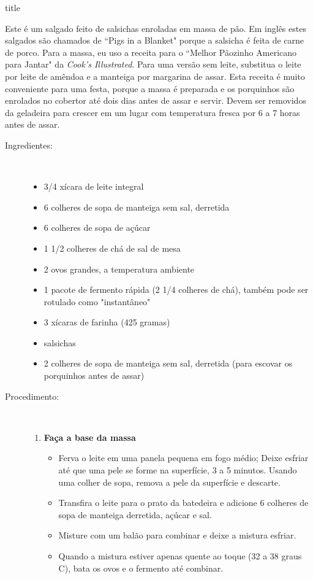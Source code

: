 \documentclass [11pt, papel de carta] {article}
\begin{document}
 {title}


Este \'e um salgado feito de salsichas enroladas em massa de p\~ao. Em ingl\^es estes salgados s\~ao chamados de ``Pigs in a Blanket" porque a salsicha \'e feita de carne de porco. Para a massa, eu uso a receita para o ``Melhor P\~aozinho Americano para Jantar" da {\it Cook's Illustrated}. Para uma versão sem leite, substitua o leite por leite de amêndoa e a manteiga por margarina de assar. Esta receita é muito conveniente para uma festa, porque a massa é preparada e os porquinhos s\~ao enrolados no cobertor até dois dias antes de assar e servir. Devem ser removidos da geladeira para crescer em um lugar com temperatura fresca por 6 a 7 horas antes de assar.

\vspace {0.3in}
\begin {description}

\item [Ingredientes:] \ \\
\begin {itemize}
\item 3/4 xícara de leite integral
\item 6 colheres de sopa de manteiga sem sal, derretida
\item 6 colheres de sopa de açúcar
\item 1 1/2 colheres de chá de sal de mesa
\item 2 ovos grandes, a temperatura ambiente
\item 1 pacote de fermento rápida (2 1/4 colheres de chá), também pode ser rotulado como "instantâneo"
\item 3 xícaras de farinha (425 gramas)
\item salsichas
\item 2 colheres de sopa de manteiga sem sal, derretida (para escovar os porquinhos antes de assar)
\end {itemize}

\item [Procedimento:] \ \\
\begin {enumerate}
\item {\bf Faça a base da massa}
\begin {itemize}
\item Ferva o leite em uma panela pequena em fogo médio; Deixe esfriar até que uma pele se forme na superfície,
3 a 5 minutos. Usando uma colher de sopa, remova a pele da superfície e descarte.
\item Transfira o leite para o prato da batedeira e adicione 6
colheres de sopa de manteiga derretida, açúcar e sal.
\item Misture com um bal\~ao para combinar e deixe a mistura esfriar.
\item Quando a mistura estiver apenas quente ao toque (32 a 38 graus C), bata os ovos e o fermento até combinar.
\end {itemize}



\end{enumerate}
\end{description}
\end{document}
